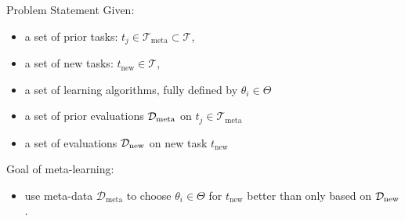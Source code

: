 \begin{frame}[c]{Problem Statement}
		Given:
	    \begin{itemize}
	        \item a set of prior tasks: 
	        $t_{j} \in \mathcal{T}_{\text{meta}} \subset \mathcal{T}$,
	        \item a set of new tasks: 
	        $t_{\text{new}} \in \mathcal{T}$,
\pause
	        \item a set of learning algorithms, fully defined by $\theta_{i} \in \Theta$
\pause
	        \item a set of prior evaluations $\mathcal{D}_{\text{meta}}$ on $t_j \in \mathcal{T}_{\text{meta}}$%
	        \item a set of evaluations $\mathcal{D}_{\text{new}}$ on new task $t_{\text{new}}$
		\end{itemize}
		\bigskip
\pause
		\alert{Goal of meta-learning:}
		\begin{itemize}
			\item use meta-data $\mathcal{D}_{\text{meta}}$ to choose $\theta_{i} \in \Theta$ for $t_{\text{new}}$ better than only based on $\mathcal{D}_{\text{new}}$. 
		\end{itemize}
\bigskip
\hspace{9cm}
\end{frame}



	
